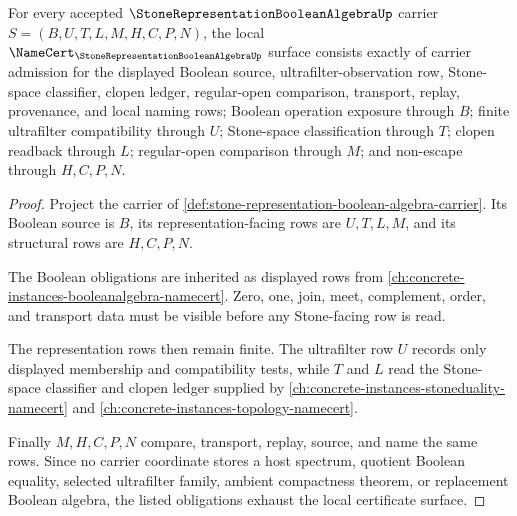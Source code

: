 \begin{theorem}
\label{thm:stone-representation-boolean-algebra-namecert-obligations}
For every accepted $\StoneRepresentationBooleanAlgebraUp$ carrier $S=(B,U,T,L,M,H,C,P,N)$, the local $\NameCert_{\StoneRepresentationBooleanAlgebraUp}$ surface consists exactly of carrier admission for the displayed Boolean source, ultrafilter-observation row, Stone-space classifier, clopen ledger, regular-open comparison, transport, replay, provenance, and local naming rows; Boolean operation exposure through $B$; finite ultrafilter compatibility through $U$; Stone-space classification through $T$; clopen readback through $L$; regular-open comparison through $M$; and non-escape through $H,C,P,N$.
\end{theorem}
\begin{proof}
Project the carrier of \autoref{def:stone-representation-boolean-algebra-carrier}. Its Boolean source is $B$, its representation-facing rows are $U,T,L,M$, and its structural rows are $H,C,P,N$.

The Boolean obligations are inherited as displayed rows from \autoref{ch:concrete-instances-booleanalgebra-namecert}. Zero, one, join, meet, complement, order, and transport data must be visible before any Stone-facing row is read.

The representation rows then remain finite. The ultrafilter row $U$ records only displayed membership and compatibility tests, while $T$ and $L$ read the Stone-space classifier and clopen ledger supplied by \autoref{ch:concrete-instances-stoneduality-namecert} and \autoref{ch:concrete-instances-topology-namecert}.

Finally $M,H,C,P,N$ compare, transport, replay, source, and name the same rows. Since no carrier coordinate stores a host spectrum, quotient Boolean equality, selected ultrafilter family, ambient compactness theorem, or replacement Boolean algebra, the listed obligations exhaust the local certificate surface.
\end{proof}

